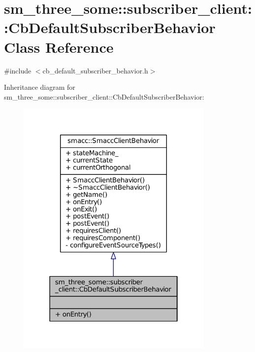 \hypertarget{classsm__three__some_1_1subscriber__client_1_1CbDefaultSubscriberBehavior}{}\section{sm\+\_\+three\+\_\+some\+:\+:subscriber\+\_\+client\+:\+:Cb\+Default\+Subscriber\+Behavior Class Reference}
\label{classsm__three__some_1_1subscriber__client_1_1CbDefaultSubscriberBehavior}


{\ttfamily \#include $<$cb\+\_\+default\+\_\+subscriber\+\_\+behavior.\+h$>$}



Inheritance diagram for sm\+\_\+three\+\_\+some\+:\+:subscriber\+\_\+client\+:\+:Cb\+Default\+Subscriber\+Behavior\+:
\nopagebreak
\begin{figure}[H]
\begin{center}
\leavevmode
\includegraphics[width=274pt]{classsm__three__some_1_1subscriber__client_1_1CbDefaultSubscriberBehavior__inherit__graph}
\end{center}
\end{figure}



